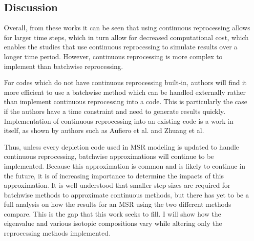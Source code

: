 \subsection{Discussion}
\label{litrev-msr-gaps}

Overall, from these works it can be seen that using continuous reprocessing allows for larger time steps, which in turn allow for decreased computational cost, which enables the studies that use continuous reprocessing to simulate results over a longer time period.
However, continuous reprocessing is more complex to implement than batchwise reprocessing.

For codes which do not have continuous reprocessing built-in, authors will find it more efficient to use a batchwise method which can be handled externally rather than implement continuous reprocessing into a code.
This is particularly the case if the authors have a time constraint and need to generate results quickly.
Implementation of continuous reprocessing into an existing code is a work in itself, as shown by authors such as Aufiero et al. and Zhuang et al.

Thus, unless every depletion code used in MSR modeling is updated to handle continuous reprocessing, batchwise approximations will continue to be implemented.
Because this approximation is common and is likely to continue in the future, it is of increasing importance to determine the impacts of this approximation.
It is well understood that smaller step sizes are required for batchwise methods to approximate continuous methods, but there has yet to be a full analysis on how the results for an MSR using the two different methods compare.
This is the gap that this work seeks to fill.
I will show how the eigenvalue and various isotopic compositions vary while altering only the reprocessing methods implemented.

